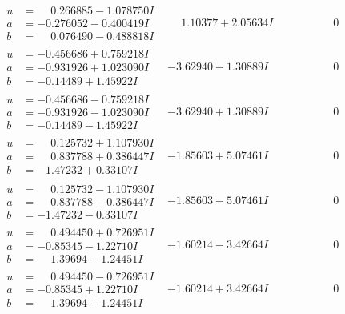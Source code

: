 \documentclass[1p]{elsarticle_modified}
\theoremstyle{definition}
\begin{document}
$$\begin{array}{c|c|c}
\begin{aligned}
u &= \phantom{-}0.266885 - 1.078750 I \\
a &= -0.276052 - 0.400419 I \\
b &= \phantom{-}0.076490 - 0.488818 I\end{aligned}
 & \phantom{-}1.10377 + 2.05634 I & \phantom{-0.000000 } 0 \\ \hline\begin{aligned}
u &= -0.456686 + 0.759218 I \\
a &= -0.931926 + 1.023090 I \\
b &= -0.14489 + 1.45922 I\end{aligned}
 & -3.62940 - 1.30889 I & \phantom{-0.000000 } 0 \\ \hline\begin{aligned}
u &= -0.456686 - 0.759218 I \\
a &= -0.931926 - 1.023090 I \\
b &= -0.14489 - 1.45922 I\end{aligned}
 & -3.62940 + 1.30889 I & \phantom{-0.000000 } 0 \\ \hline\begin{aligned}
u &= \phantom{-}0.125732 + 1.107930 I \\
a &= \phantom{-}0.837788 + 0.386447 I \\
b &= -1.47232 + 0.33107 I\end{aligned}
 & -1.85603 + 5.07461 I & \phantom{-0.000000 } 0 \\ \hline\begin{aligned}
u &= \phantom{-}0.125732 - 1.107930 I \\
a &= \phantom{-}0.837788 - 0.386447 I \\
b &= -1.47232 - 0.33107 I\end{aligned}
 & -1.85603 - 5.07461 I & \phantom{-0.000000 } 0 \\ \hline\begin{aligned}
u &= \phantom{-}0.494450 + 0.726951 I \\
a &= -0.85345 - 1.22710 I \\
b &= \phantom{-}1.39694 - 1.24451 I\end{aligned}
 & -1.60214 - 3.42664 I & \phantom{-0.000000 } 0 \\ \hline\begin{aligned}
u &= \phantom{-}0.494450 - 0.726951 I \\
a &= -0.85345 + 1.22710 I \\
b &= \phantom{-}1.39694 + 1.24451 I\end{aligned}
 & -1.60214 + 3.42664 I & \phantom{-0.000000 } 0 \\ \hline\begin{aligned}

\end{aligned}
\end{array}$$
\end{document}
